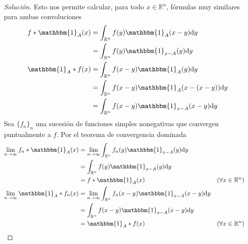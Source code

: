\documentclass{article}
\newcommand{\characteristic}{\mathbbm{1}}
\newcommand{\realNumbers}{\mathbb{R}}
\theoremstyle{remark}
\begin{document}
\begin{proof}[Solución]
    Esto nos permite calcular, para todo \(x \in \realNumbers^n\), fórmulas muy similares para ambas convoluciones
    \begin{align}
      f * \characteristic_A (x)
      &=
      \int_{\realNumbers^n} f(y) \characteristic_A (x - y) \dd y
      \\
      &=
      \int_{\realNumbers^n} f(y) \characteristic_{x - A} (y) \dd y
      \\
      \characteristic_A * f (x)
      &=
      \int_{\realNumbers^n} f(x - y) \characteristic_A (y) \dd y
      \\
      &=
      \int_{\realNumbers^n} f(x - y) \characteristic_A (x - (x - y)) \dd y
      \\
      &=
      \int_{\realNumbers^n} f(x - y) \characteristic_{x - A} (x - y) \dd y
    \end{align}
    Sea \(\{f_n\}_n\) una sucesión de funciones simples nonegativas que convergen puntualmente a \(f\).
    Por el teorema de convergencia dominada
    \begin{align}
      \lim_{n \rightarrow \infty} f_n * \characteristic_A (x)
      &=
      \lim_{n \rightarrow \infty} \int_{\realNumbers^n} f_n(y)\characteristic_{x - A}(y) \dd y
      \\
      &=
      \int_{\realNumbers^n} f(y) \characteristic_{x - A}(y) \dd y
      \\
      &=
      f * \characteristic_A (x)
      && (\forall x \in \realNumbers^n)
      \\
      \lim_{n \rightarrow \infty} \characteristic_A * f_n (x)
      &=
      \lim_{n \rightarrow \infty} \int_{\realNumbers^n} f_n(x - y)\characteristic_{x - A}(x - y) \dd y
      \\
      &=
      \int_{\realNumbers^n} f(x - y) \characteristic_{x - A}(x - y) \dd y
      \\
      &=
      \characteristic_A * f (x)
      && (\forall x \in \realNumbers^n)
    \end{align}    
  \end{proof}
\end{document}
